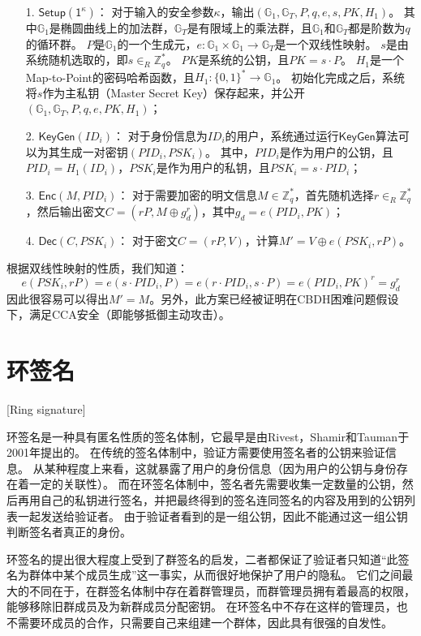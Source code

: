 \begin{itemize}
  \item[1.] $\mathsf{Setup(1^\kappa)}$： 对于输入的安全参数$\kappa$，输出$(\mathbb{G}_1,\mathbb{G}_T,P,q,e,s,PK,H_1)$。
  其中$\mathbb{G}_1$是椭圆曲线上的加法群，$\mathbb{G}_T$是有限域上的乘法群，且$\mathbb{G}_1$和$\mathbb{G}_T$都是阶数为$q$的循环群。
  $P$是$\mathbb{G}_1$的一个生成元，$e:\mathbb{G}_1\times\mathbb{G}_1\rightarrow \mathbb{G}_T$是一个双线性映射。
  $s$是由系统随机选取的，即$s\in_R \mathbb{Z}_q^*$。
  $PK$是系统的公钥，且$PK=s\cdot P$。
  $H_1$是一个Map-to-Point的密码哈希函数，且$H_1:\{0,1\}^*\rightarrow\mathbb{G}_1$。
  初始化完成之后，系统将$s$作为主私钥（Master Secret Key）保存起来，并公开$(\mathbb{G}_1,\mathbb{G}_T,P,q,e,PK,H_1)$；
  \item[2.] $\mathsf{KeyGen}(ID_i)$： 对于身份信息为$ID_i$的用户，系统通过运行$\mathsf{KeyGen}$算法可以为其生成一对密钥$(PID_i,PSK_i)$。
  其中，$PID_i$是作为用户的公钥，且$PID_i=H_1(ID_i)$，$PSK_i$是作为用户的私钥，且$PSK_i=s\cdot PID_i$；
  \item[3.] $\mathsf{Enc}(M,PID_i)$： 对于需要加密的明文信息$M\in\mathbb{Z}_q^*$，首先随机选择$r\in_R\mathbb{Z}_q^*$，然后输出密文$C=(rP,M\oplus g_d^r)$，其中$g_d=e(PID_i,PK)$；
  \item[4.] $\mathsf{Dec}(C,PSK_i)$： 对于密文$C=(rP,V)$，计算$M'=V\oplus e(PSK_i,rP)$。
\end{itemize}
根据双线性映射的性质，我们知道：
\begin{equation}
e(PSK_i,rP)=e(s\cdot PID_i, P)=e(r\cdot PID_i, s\cdot P)=e(PID_i,PK)^r=g_d^r
\end{equation}
因此很容易可以得出$M'=M$。另外，此方案已经被证明在CBDH困难问题假设下，满足CCA安全（即能够抵御主动攻击）。

\section{环签名}[Ring signature]

环签名是一种具有匿名性质的签名体制，它最早是由Rivest，Shamir和Tauman于2001年提出的\cite{rivest2001leak}。
在传统的签名体制中，验证方需要使用签名者的公钥来验证信息。
从某种程度上来看，这就暴露了用户的身份信息（因为用户的公钥与身份存在着一定的关联性）。
而在环签名体制中，签名者先需要收集一定数量的公钥，然后再用自己的私钥进行签名，并把最终得到的签名连同签名的内容及用到的公钥列表一起发送给验证者。
由于验证者看到的是一组公钥，因此不能通过这一组公钥判断签名者真正的身份。

环签名的提出很大程度上受到了群签名的启发\cite{chaum1991group}，二者都保证了验证者只知道“此签名为群体中某个成员生成”这一事实，从而很好地保护了用户的隐私。
它们之间最大的不同在于，在群签名体制中存在着群管理员，而群管理员拥有着最高的权限，能够移除旧群成员及为新群成员分配密钥。
在环签名中不存在这样的管理员，也不需要环成员的合作，只需要自己来组建一个群体，因此具有很强的自发性。

